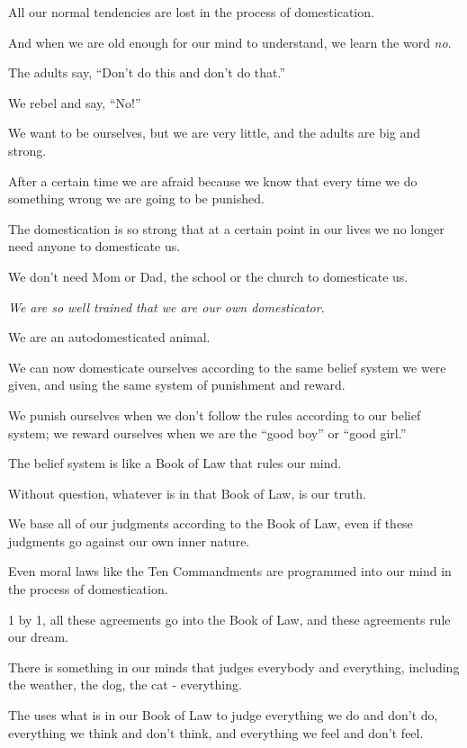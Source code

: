 \documentclass{article}
\numberwithin{equation}{section}
\begin{document}
%
All our normal tendencies are lost in the process of domestication.

And when we are old enough for our mind to understand, we learn the word \textit{no}.

The adults say, ``Don't do this and don't do that.''

We rebel and say, ``No!''


We want to be ourselves, but we are very little, and the adults are big and strong.

After a certain time we are afraid because we know that every time we do something wrong we are going to be punished.

%
The domestication is so strong that at a certain point in our lives we no longer need anyone to domesticate us.

We don't need Mom or Dad, the school or the church to domesticate us.

\textit{We are so well trained that we are our own domesticator}.

We are an autodomesticated animal.

We can now domesticate ourselves according to the same belief system we were given, and using the same system of punishment and reward.

We punish ourselves when we don't follow the rules according to our belief system; we reward ourselves when we are the ``good boy'' or ``good girl.''

%
The belief system is like a Book of Law that rules our mind.

Without question, whatever is in that Book of Law, is our truth.

We base all of our judgments according to the Book of Law, even if these judgments go against our own inner nature.

Even moral laws like the Ten Commandments are programmed into our mind in the process of domestication.

1 by 1, all these agreements go into the Book of Law, and these agreements rule our dream.

%
There is something in our minds that judges everybody and everything, including the weather, the dog, the cat - everything.

The  uses what is in our Book of Law to judge everything we do and don't do, everything we think and don't think, and everything we feel and don't feel.
\end{document}
